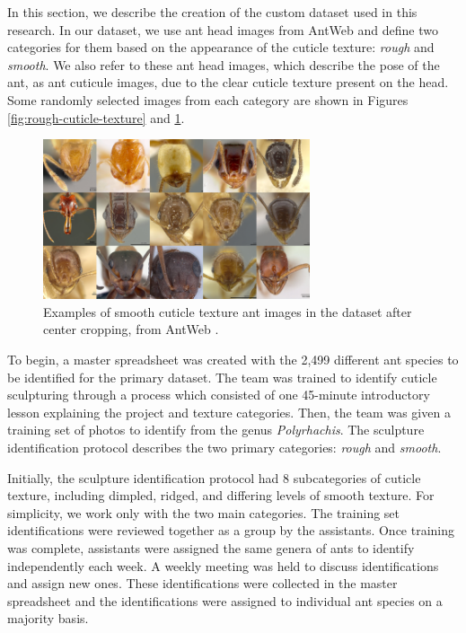 \documentclass{aci}
\numberwithin{equation}{section}
\begin{document}
In this section, we describe the creation of the custom dataset used in this
research. In our dataset, we use ant head images from AntWeb
\cite{perrichot_antweb_2012} and define two categories for them based on the
appearance of the cuticle texture: \textit{rough} and \textit{smooth}. We also
refer to these ant head images, which describe the pose of the ant, as ant
cuticule images, due to the clear cuticle texture present on the head. Some
randomly selected images from each category are shown in Figures
\ref{fig:rough-cuticle-texture} and \ref{fig:smooth-cuticle-texture}.

\begin{figure}
    \centering
    \includegraphics[width=0.7\textwidth]{thesis_assets/images/smooth_collage.png}
    \caption{Examples of smooth cuticle texture ant images in the dataset after
        center cropping, from AntWeb \cite{perrichot_antweb_2012}.}
    \label{fig:smooth-cuticle-texture}
\end{figure}

To begin, a master spreadsheet was created with the 2,499 different ant species
to be identified for the primary dataset. The team was trained to identify
cuticle sculpturing through a process which consisted of one 45-minute
introductory lesson explaining the project and texture categories. Then, the
team was given a training set of photos to identify from the genus
\textit{Polyrhachis}. The sculpture identification protocol describes the two
primary categories: \textit{rough} and \textit{smooth}.

Initially, the sculpture identification protocol had 8 subcategories of cuticle
texture, including dimpled, ridged, and differing levels of smooth texture. For
simplicity, we work only with the two main categories. The training set
identifications were reviewed together as a group by the assistants. Once
training was complete, assistants were assigned the same genera of ants to
identify independently each week. A weekly meeting was held to discuss
identifications and assign new ones. These identifications were collected in the
master spreadsheet and the identifications were assigned to individual ant
species on a majority basis.
\end{document}
